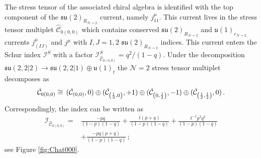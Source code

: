 \documentclass[main.tex]{subfiles}
\begin{document}
The stress tensor of the associated chiral algebra is identified with the top component of the $\mathfrak{su}(2)_{R_{\mathcal{N}=2}}$ current, namely $j^{\mu}_{11}$. This current lives in the stress tensor multiplet $\hat{\mathcal{C}}_{0(0,0)}$ which contains conserved $\mathfrak{su}(2)_{R_{\mathcal{N}=2}}$ and $\mathfrak{u}(1)_{r_{\mathcal{N}=2}}$ currents $j^{\mu}_{(IJ)}$ and $j^{\mu}$ with $I,J=1,2$ $\mathfrak{su}(2)_{R_{\mathcal{N}=2}}$ indices. This current enters the Schur index $\mathcal{I}^S$ with a factor $\mathcal{I}^S_{\hat{\mathcal{C}}_{0(0,0)}}=q^2/(1-q)$.
Under the decomposition $\mathfrak{su}(2,2|2)\to\mathfrak{su}(2,2|1)\oplus\mathfrak{u}(1)_t$ the $\mathcal{N}=2$ stress tensor multiplet decomposes as
\begin{equation}
\hat{\mathcal{C}}_{0(0,0)}\cong\, (\hat{\mathcal{C}}_{(0,0)},0)\oplus (\hat{\mathcal{C}}_{\left(\frac{1}{2},0\right)},+1)\oplus  (\hat{\mathcal{C}}_{\left(0,\frac{1}{2}\right)},-1)\oplus (\hat{\mathcal{C}}_{\left(\frac{1}{2},\frac{1}{2}\right)},0)\,.
\end{equation}
Correspondingly, the index can be written as
\begin{equation}
\begin{aligned}
\mathcal{I}_{\hat{\mathcal{C}}_{0(0,0)}}=&\frac{-pq}{(1-p)(1-q)}+\frac{t(p+q)}{(1-p)(1-q)}+\frac{t^{-1}p^2q^{2}}{(1-p)(1-q)}\\
&+\frac{-pq(p+q)}{(1-p)(1-q)}\,;\end{aligned}
\end{equation}
see Figure \ref{fig:Chat000}. 
\end{document}

